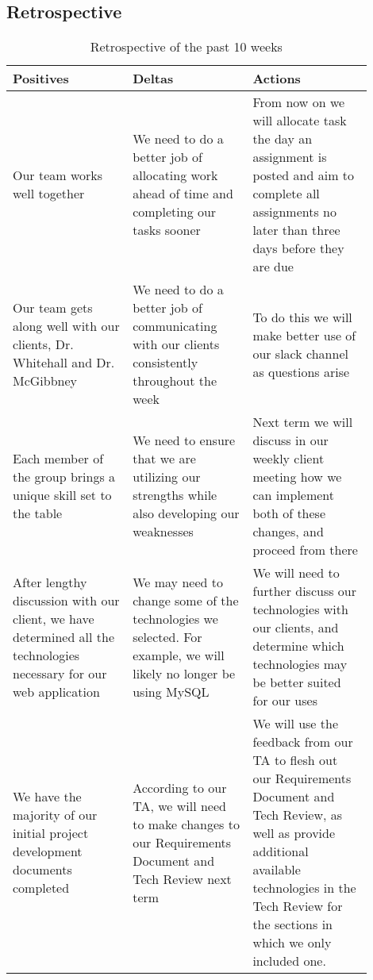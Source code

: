 \documentclass[onecolumn, draftclsnofoot,10pt, compsoc]{IEEEtran}
\begin{document}
\begin{flushleft}
\clearpage

\section{Retrospective}
\begin{table}[h!]
\caption{Retrospective of the past 10 weeks}\label{table:1}
\centering
    \begin{tabular}{| p{0.3\linewidth} | p{0.3\linewidth} | p{0.3\linewidth}  |} 
        \hline
        Positives & Deltas & Actions \\ [0.5ex] 
        \hline
        Our team works well together & We need to do a better job of allocating work ahead of time and completing our tasks sooner &  From now on we will allocate task the day an assignment is posted and aim to complete all assignments no later than three days before they are due \\ [0.5ex]
        \hline
        Our team gets along well with our clients, Dr. Whitehall and Dr. McGibbney & We need to do a better job of communicating with our clients consistently throughout the week & To do this we will make better use of our slack channel as questions arise \\ [0.5ex]
        \hline
         Each member of the group brings a unique skill set to the table & We need to ensure that we are utilizing our strengths while also developing our weaknesses & Next term we will discuss in our weekly client meeting how we can implement both of these changes, and proceed from there \\ [0.5ex]
        \hline
        After lengthy discussion with our client, we have determined all the technologies necessary for our web application  & We may need to change some of the technologies we selected. For example, we will likely no longer be using MySQL & We will need to further discuss our technologies with our clients, and determine which technologies may be better suited for our uses \\ [0.5ex]
        \hline
        We have the majority of our initial project development documents completed & According to our TA, we will need to make changes to our Requirements Document and Tech Review next term & We will use the feedback from our TA to flesh out our Requirements Document and Tech Review, as well as provide additional available technologies in the Tech Review for the sections in which we only included one. \\ [0.5ex] 
        \hline
    \end{tabular}
\end{table}


\end{flushleft}
\end{document}
